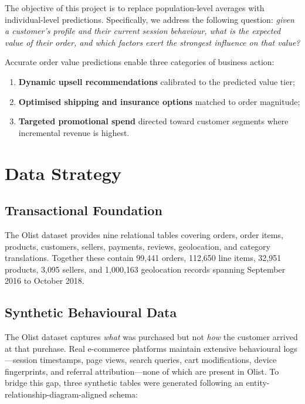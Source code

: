 \documentclass[11pt,a4paper]{article}
\begin{document}
The objective of this project is to replace population-level averages with
individual-level predictions.  Specifically, we address the following question:
\emph{given a customer's profile and their current session behaviour, what is
the expected value of their order, and which factors exert the strongest
influence on that value?}

Accurate order value predictions enable three categories of business action:
\begin{enumerate}
  \item \textbf{Dynamic upsell recommendations} calibrated to the predicted
        value tier;
  \item \textbf{Optimised shipping and insurance options} matched to order
        magnitude;
  \item \textbf{Targeted promotional spend} directed toward customer segments
        where incremental revenue is highest.
\end{enumerate}

\section{Data Strategy}
\label{sec:data}

\subsection{Transactional Foundation}

The Olist dataset provides nine relational tables covering orders, order items,
products, customers, sellers, payments, reviews, geolocation, and category
translations.  Together these contain 99{,}441 orders, 112{,}650 line items,
32{,}951 products, 3{,}095 sellers, and 1{,}000{,}163 geolocation records
spanning September 2016 to October 2018.

\subsection{Synthetic Behavioural Data}

The Olist dataset captures \emph{what} was purchased but not \emph{how} the
customer arrived at that purchase.  Real e-commerce platforms maintain extensive
behavioural logs---session timestamps, page views, search queries, cart
modifications, device fingerprints, and referral attribution---none of which are
present in Olist.  To bridge this gap, three synthetic tables were generated
following an entity-relationship-diagram-aligned schema:
\end{document}
